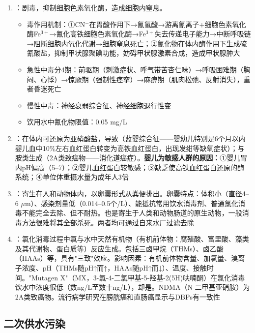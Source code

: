 \documentclass[10pt,a4paper,oneside]{ctexbook}
\begin{document}
\begin{enumerate}[leftmargin=*]
    \item {}：剧毒，抑制细胞色素氧化酶，造成细胞内窒息。
    \begin{itemize}
        \item 毒作用机制：①CN$^-$在胃酸作用下→氰氢酸→游离氰离子+细胞色素氧化酶Fe$^{3+}$→氰化高铁细胞色素氧化酶→Fe$^{3+}$失去传递电子能力→中断呼吸链→阻断细胞内氧化代谢→细胞窒息死亡；②氰化物在体内酶作用下生成硫氰酸盐，抑制甲状腺聚碘功能，妨碍甲状腺激素合成，造成甲状腺肿大
        \item 急性中毒分4期：前驱期（刺激症状、呼气带苦杏仁味）→呼吸困难期（胸闷、心悸）→惊厥期（强制性痉挛）→麻痹期（肌肉松弛、反射消失），重者昏迷死亡
        \item 慢性中毒：神经衰弱综合征、神经细胞退行性变
        \item 饮用水中氰化物限值：0.05 mg/L
    \end{itemize}
    \item {}：在体内可还原为亚硝酸盐，导致（蓝婴综合征——婴幼儿特别是6个月以内婴儿血中10\%左右血红蛋白转变为高铁血红蛋白，出现发绀等缺氧症状）；与胺类生成（2A类致癌物——消化道癌症）。\textbf{婴儿为敏感人群的原因：}①婴儿胃内pH偏高（5--7）；②婴儿血红蛋白较敏感；③缺乏使高铁血红蛋白还原的酶系统；④单位体重摄水量为成年人3倍
    \item {}：寄生在人和动物体内，以卵囊形式从粪便排出。卵囊特点：体积小（直径4--6 $\mu$m）、感染剂量低（0.014--0.5个/L）、能抵抗常用饮水消毒剂、普通氯化消毒不能完全去除、但不耐热。也是寄生于人类和动物肠道的原生动物，一般消毒方法很难将其全部杀死。两者均可通过自来水厂过滤去除
    \item {}：氯化消毒过程中氯与水中天然有机物（有机前体物：腐殖酸、富里酸、藻类及其代谢物、蛋白质等）反应生成。包括三卤甲烷（THMs）、卤乙酸（HAAs）等，具有"三致"效应。影响因素：有机前体物含量、加氯量、溴离子浓度、pH（THMs随pH↑而↑，HAAs随pH↑而↓）、温度、接触时间。"Mutagen X"（MX，3-氯-4-二氯甲基-5-羟基-2(5H)呋喃酮）在氯化消毒饮水中浓度很低（数ng/L至数十ng/L），却是。NDMA（N-二甲基亚硝胺）为2A类致癌物。流行病学研究在膀胱癌和直肠癌显示与DBPs有一致性
\end{enumerate}

\subsection{二次供水污染}
\end{document}
